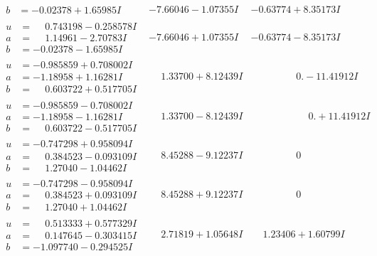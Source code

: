\documentclass[1p]{elsarticle_modified}
\theoremstyle{definition}
\begin{document}
$$\begin{array}{c|c|c}
\begin{aligned}
b &= -0.02378 + 1.65985 I\end{aligned}
 & -7.66046 - 1.07355 I & -0.63774 + 8.35173 I \\ \hline\begin{aligned}
u &= \phantom{-}0.743198 - 0.258578 I \\
a &= \phantom{-}1.14961 - 2.70783 I \\
b &= -0.02378 - 1.65985 I\end{aligned}
 & -7.66046 + 1.07355 I & -0.63774 - 8.35173 I \\ \hline\begin{aligned}
u &= -0.985859 + 0.708002 I \\
a &= -1.18958 + 1.16281 I \\
b &= \phantom{-}0.603722 + 0.517705 I\end{aligned}
 & \phantom{-}1.33700 + 8.12439 I & \phantom{-0.000000 } 0. - 11.41912 I \\ \hline\begin{aligned}
u &= -0.985859 - 0.708002 I \\
a &= -1.18958 - 1.16281 I \\
b &= \phantom{-}0.603722 - 0.517705 I\end{aligned}
 & \phantom{-}1.33700 - 8.12439 I & \phantom{-0.000000 -}0. + 11.41912 I \\ \hline\begin{aligned}
u &= -0.747298 + 0.958094 I \\
a &= \phantom{-}0.384523 - 0.093109 I \\
b &= \phantom{-}1.27040 - 1.04462 I\end{aligned}
 & \phantom{-}8.45288 - 9.12237 I & \phantom{-0.000000 } 0 \\ \hline\begin{aligned}
u &= -0.747298 - 0.958094 I \\
a &= \phantom{-}0.384523 + 0.093109 I \\
b &= \phantom{-}1.27040 + 1.04462 I\end{aligned}
 & \phantom{-}8.45288 + 9.12237 I & \phantom{-0.000000 } 0 \\ \hline\begin{aligned}
u &= \phantom{-}0.513333 + 0.577329 I \\
a &= \phantom{-}0.147645 - 0.303415 I \\
b &= -1.097740 - 0.294525 I\end{aligned}
 & \phantom{-}2.71819 + 1.05648 I & \phantom{-}1.23406 + 1.60799 I \\ \hline\begin{aligned}

\end{aligned}
\end{array}$$
\end{document}
